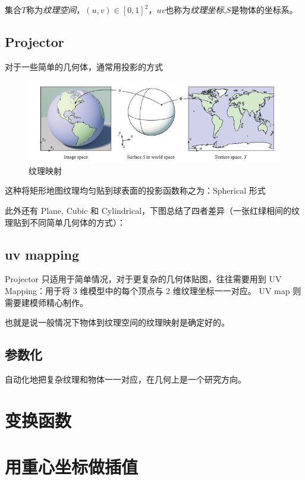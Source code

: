 集合$T$称为\textsl{纹理空间}，$(u,v)\in [0,1]^2$，$uv$也称为\textsl{纹理坐标},$S$是物体的坐标系。

\subsection*{Projector}

对于一些简单的几何体，通常用投影的方式

\begin{figure}[H]
    \centering
    \includegraphics[scale=0.6]{figures/纹理映射.png}
    \caption{纹理映射}
\end{figure}

这种将矩形地图纹理均匀贴到球表面的投影函数称之为：Spherical 形式

此外还有 Plane, Cubic 和 Cylindrical，下图总结了四者差异（一张红绿相间的纹理贴到不同简单几何体的方式）：

\subsection*{uv mapping}

Projector 只适用于简单情况，对于更复杂的几何体贴图，往往需要用到 UV Mapping：用于将 3 维模型中的每个顶点与 2 维纹理坐标一一对应。 UV map 则需要建模师精心制作。

也就是说一般情况下物体到纹理空间的纹理映射是确定好的。

\subsection*{参数化}

自动化地把复杂纹理和物体一一对应，在几何上是一个研究方向。

\section{变换函数}

\section{用重心坐标做插值}


